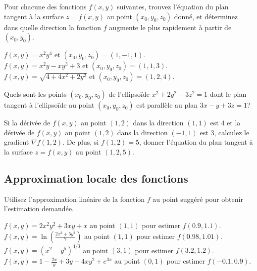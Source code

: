 \begin{question}[\eng]
Pour chacune des fonctions $f(x,y)$ suivantes, trouvez l'équation du
plan tangent à la surface $z=f(x,y)$ au point $(x_0,y_0,z_0)$ donné,
et déterminez dans quelle direction la fonction $f$ augmente le
plus rapidement à partir de $(x_0,y_0)$.

 $f(x,y) = x^2 y^4$ et $(x_0,y_0,z_0) = (1,-1,1)$.\\
 $f(x,y) = x^2y - xy^3 + 3$ et $(x_0,y_0,z_0) = (1,1,3)$.\\
 $f(x,y) = \sqrt{4+4x^2+2y^2}$ et $(x_0,y_0,z_0) = (1,2,4)$.
\label{15Q15}
\end{question}

\begin{question}[\eng]
Quels sont les points $(x_0,y_0,z_0)$ de l'ellipsoïde $x^2+2y^2+3z^2 = 1$
dont le plan tangent à l'ellipsoïde au point $(x_0,y_0,z_0)$ est
parallèle au plan $3x - y + 3z = 1$?
\label{15Q16}
\end{question}

\begin{question}[\eng]
Si la dérivée de $f(x,y)$ au point $(1,2)$ dans la direction $(1,1)$
est $4$ et la dérivée de $f(x,y)$ au point $(1,2)$ dans la direction
$(-1,1)$ est $3$, calculez le gradient $\nabla f(1,2)$.  De plus, si
$f(1,2) = 5$, donner l'équation du plan tangent à la surface
$z=f(x,y)$ au point $(1,2,5)$.
\label{15Q17}
\end{question}

\subsection{Approximation locale des fonctions}

\begin{question}
Utilisez l'approximation linéaire de la fonction $f$ au point suggéré
pour obtenir l'estimation demandée.

 $\displaystyle f(x,y)=2x^2y^2+3xy+x$ au point $(1,1)$ pour
estimer $f(0.9,1.1)$.\\
 $\displaystyle f(x,y) =  \ln\left(\frac{2x^2+5y^2}{7}\right)$
au point $(1,1)$ pour estimer $f(0.98,1.01)$.\\
 $\displaystyle f(x,y) = (x^2-y^5)^{4/3}$ au point $(3,1)$
pour estimer $f(3.2,1.2)$.\\
 $\displaystyle f(x,y)= 1- \frac{2x}{y}+3y-4xy^2+e^{3x}$ au
point $(0,1)$ pour estimer $f(-0.1,0.9)$.
\label{15Q18}
\end{question}

